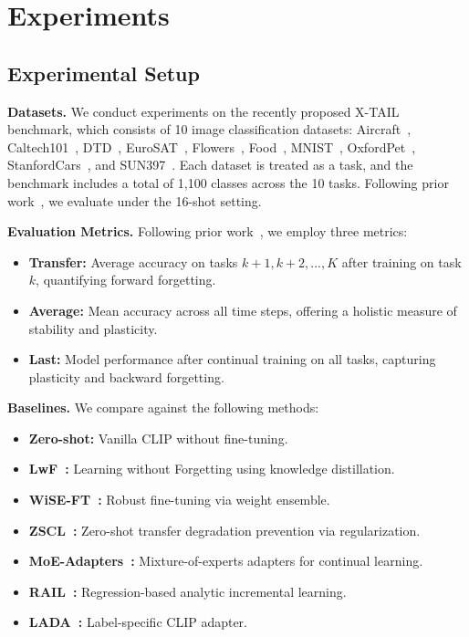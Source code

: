 \documentclass{article}
\begin{document}
\fi
\section{Experiments}
\label{sec:experiments}

\subsection{Experimental Setup}

\textbf{Datasets.}
We conduct experiments on the recently proposed X-TAIL~\cite{xu2024rail} benchmark, which consists of 10 image classification datasets: Aircraft~\cite{maji2013fine}, Caltech101~\cite{fei2004learning}, DTD~\cite{cimpoi2014describing}, EuroSAT~\cite{helber2019eurosat}, Flowers~\cite{nilsback2008automated}, Food~\cite{bossard2014food}, MNIST~\cite{deng2012mnist}, OxfordPet~\cite{parkhi2012cats}, StanfordCars~\cite{krause2013collecting}, and SUN397~\cite{xiao2010sun}. Each dataset is treated as a task, and the benchmark includes a total of 1,100 classes across the 10 tasks. Following prior work~\cite{zheng2023zscl}, we evaluate under the 16-shot setting.

\textbf{Evaluation Metrics.}
Following prior work~\cite{zheng2023zscl}, we employ three metrics:
\begin{itemize}
    \item \textbf{Transfer:} Average accuracy on tasks $k+1, k+2, ..., K$ after training on task $k$, quantifying forward forgetting.
    \item \textbf{Average:} Mean accuracy across all time steps, offering a holistic measure of stability and plasticity.
    \item \textbf{Last:} Model performance after continual training on all tasks, capturing plasticity and backward forgetting.
\end{itemize}

\textbf{Baselines.}
We compare against the following methods:
\begin{itemize}
    \item \textbf{Zero-shot:} Vanilla CLIP without fine-tuning.
    \item \textbf{LwF~\cite{li2017learning}:} Learning without Forgetting using knowledge distillation.
    \item \textbf{WiSE-FT~\cite{wortsman2022robust}:} Robust fine-tuning via weight ensemble.
    \item \textbf{ZSCL~\cite{zheng2023zscl}:} Zero-shot transfer degradation prevention via regularization.
    \item \textbf{MoE-Adapters~\cite{yu2024moe}:} Mixture-of-experts adapters for continual learning.
    \item \textbf{RAIL~\cite{xu2024rail}:} Regression-based analytic incremental learning.
    \item \textbf{LADA~\cite{luo2025lada}:} Label-specific CLIP adapter.
\end{itemize}
\end{document}
